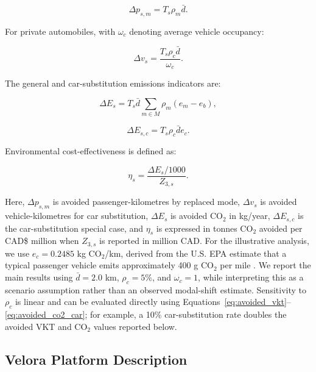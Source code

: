 \documentclass[preprint,authoryear,10pt]{elsarticle}
\begin{document}
\begin{equation}
\label{eq:avoided_pkm}
\Delta p_{s,m} = T_s \rho_m \bar{d}.
\end{equation}

For private automobiles, with $\omega_c$ denoting average vehicle occupancy:

\begin{equation}
\label{eq:avoided_vkt}
\Delta v_s = \frac{T_s \rho_c \bar{d}}{\omega_c}.
\end{equation}

The general and car-substitution emissions indicators are:

\begin{equation}
\label{eq:avoided_co2_general}
\Delta E_s = T_s \bar{d} \sum_{m\in M} \rho_m (e_m - e_b),
\end{equation}

\begin{equation}
\label{eq:avoided_co2_car}
\Delta E_{s,c} = T_s \rho_c \bar{d} e_c.
\end{equation}

Environmental cost-effectiveness is defined as:

\begin{equation}
\label{eq:co2_cost_effectiveness}
\eta_s = \frac{\Delta E_s/1000}{Z_{3,s}}.
\end{equation}

Here, $\Delta p_{s,m}$ is avoided passenger-kilometres by replaced mode, $\Delta v_s$ is avoided vehicle-kilometres for car substitution, $\Delta E_s$ is avoided CO$_2$ in kg/year, $\Delta E_{s,c}$ is the car-substitution special case, and $\eta_s$ is expressed in tonnes CO$_2$ avoided per CAD\$ million when $Z_{3,s}$ is reported in million CAD. For the illustrative analysis, we use $e_c=0.2485$ kg CO$_2$/km, derived from the U.S. EPA estimate that a typical passenger vehicle emits approximately 400 g CO$_2$ per mile \citep{epaTypicalVehicle2025}. We report the main results using $\bar{d}=2.0$ km, $\rho_c=5\%$, and $\omega_c=1$, while interpreting this as a scenario assumption rather than an observed modal-shift estimate. Sensitivity to $\rho_c$ is linear and can be evaluated directly using Equations~\eqref{eq:avoided_vkt}--\eqref{eq:avoided_co2_car}; for example, a 10\% car-substitution rate doubles the avoided VKT and CO$_2$ values reported below.

\subsection{Velora Platform Description}\label{subsec:velora_platform}
\end{document}
